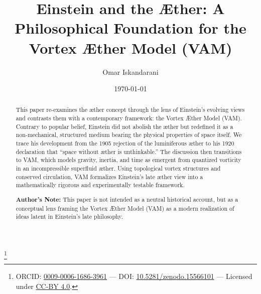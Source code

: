 \documentclass[a4paper,12pt]{revtex4}
\begin{document}
    \date{\today}
    \author{Omar Iskandarani}
    \title{Einstein and the Æther: A Philosophical Foundation for the Vortex Æther Model (VAM)}
    \thanks{ORCID: \href{https://orcid.org/0009-0006-1686-3961}{0009-0006-1686-3961} — \footnotesize DOI: \href{https://doi.org/10.5281/zenodo.15566101}{10.5281/zenodo.15566101}  — Licensed under \href{https://creativecommons.org/licenses/by/4.0/}{CC-BY 4.0}.}


    \begin{abstract}
        This paper re-examines the æther concept through the lens of Einstein’s evolving views and contrasts them with a contemporary framework: the Vortex Æther Model (VAM). Contrary to popular belief, Einstein did not abolish the æther but redefined it as a non-mechanical, structured medium bearing the physical properties of space itself. We trace his development from the 1905 rejection of the luminiferous æther to his 1920 declaration that “space without æther is unthinkable.” The discussion then transitions to VAM, which models gravity, inertia, and time as emergent from quantized vorticity in an incompressible superfluid æther. Using topological vortex structures and conserved circulation, VAM formalizes Einstein’s late æther view into a mathematically rigorous and experimentally testable framework.

        \textbf{Author’s Note:} This paper is not intended as a neutral historical account, but as a conceptual lens framing the Vortex Æther Model (VAM) as a modern realization of ideas latent in Einstein’s late philosophy.
    \end{abstract}

    \maketitle

    
    
    

    \appendix \label{sec:Appendix}
        
        
        

    
    
\end{document}

